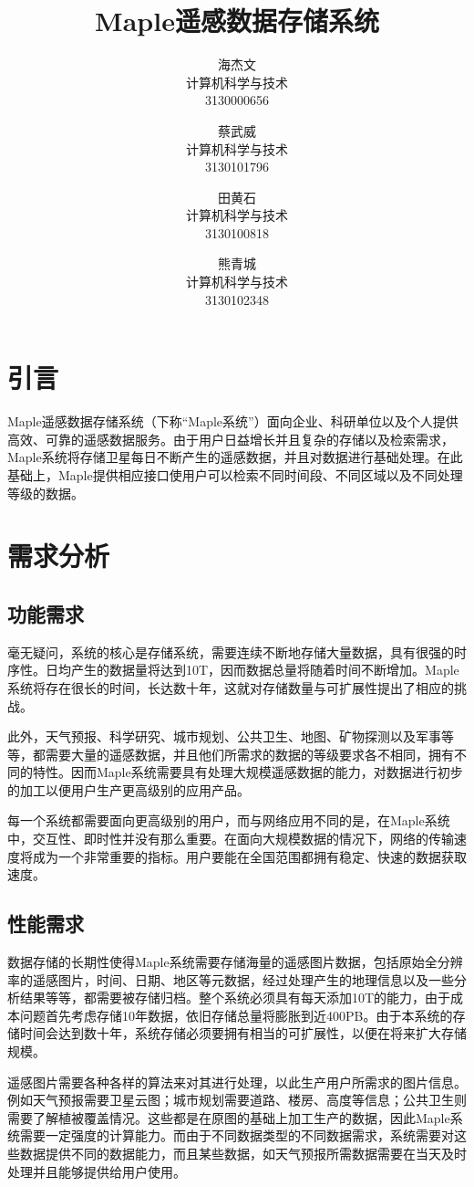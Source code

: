 \documentclass{article}
\title{Maple遥感数据存储系统}
\author{
    海杰文\\
    计算机科学与技术\\
    3130000656
  	\and
    蔡武威\\
    计算机科学与技术\\
    3130101796
    \and
    田黄石\\
    计算机科学与技术\\
    3130100818
    \and
    熊青城\\
    计算机科学与技术\\
    3130102348
}
\date{}
\begin{document}
\maketitle

\section{引言}
Maple遥感数据存储系统（下称“Maple系统”）面向企业、科研单位以及个人提供高效、可靠的遥感数据服务。由于用户日益增长并且复杂的存储以及检索需求，Maple系统将存储卫星每日不断产生的遥感数据，并且对数据进行基础处理。在此基础上，Maple提供相应接口使用户可以检索不同时间段、不同区域以及不同处理等级的数据。

\section{需求分析}
\subsection{功能需求}
毫无疑问，系统的核心是存储系统，需要连续不断地存储大量数据，具有很强的时序性。日均产生的数据量将达到10T，因而数据总量将随着时间不断增加。Maple系统将存在很长的时间，长达数十年，这就对存储数量与可扩展性提出了相应的挑战。

此外，天气预报、科学研究、城市规划、公共卫生、地图、矿物探测以及军事等等，都需要大量的遥感数据，并且他们所需求的数据的等级要求各不相同，拥有不同的特性。因而Maple系统需要具有处理大规模遥感数据的能力，对数据进行初步的加工以便用户生产更高级别的应用产品。

每一个系统都需要面向更高级别的用户，而与网络应用不同的是，在Maple系统中，交互性、即时性并没有那么重要。在面向大规模数据的情况下，网络的传输速度将成为一个非常重要的指标。用户要能在全国范围都拥有稳定、快速的数据获取速度。

\subsection{性能需求}
数据存储的长期性使得Maple系统需要存储海量的遥感图片数据，包括原始全分辨率的遥感图片，时间、日期、地区等元数据，经过处理产生的地理信息以及一些分析结果等等，都需要被存储归档。整个系统必须具有每天添加10T的能力，由于成本问题首先考虑存储10年数据，依旧存储总量将膨胀到近400PB。由于本系统的存储时间会达到数十年，系统存储必须要拥有相当的可扩展性，以便在将来扩大存储规模。

遥感图片需要各种各样的算法来对其进行处理，以此生产用户所需求的图片信息。例如天气预报需要卫星云图；城市规划需要道路、楼房、高度等信息；公共卫生则需要了解植被覆盖情况。这些都是在原图的基础上加工生产的数据，因此Maple系统需要一定强度的计算能力。而由于不同数据类型的不同数据需求，系统需要对这些数据提供不同的数据能力，而且某些数据，如天气预报所需数据需要在当天及时处理并且能够提供给用户使用。
\end{document}
